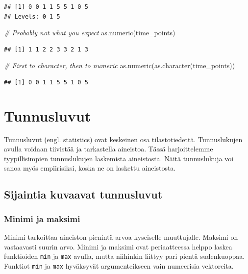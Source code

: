 \documentclass[
]{book}
\newenvironment{Shaded}{\begin{snugshade}}{\end{snugshade}}
\newcommand{\CommentTok}[1]{\textcolor[rgb]{0.56,0.35,0.01}{\textit{#1}}}
\newcommand{\FunctionTok}[1]{\textcolor[rgb]{0.00,0.00,0.00}{#1}}
\newcommand{\NormalTok}[1]{#1}
\begin{document}
\begin{verbatim}
## [1] 0 0 1 1 5 5 1 0 5
## Levels: 0 1 5
\end{verbatim}

\begin{Shaded}
\begin{Highlighting}[]
\CommentTok{\# Probably not what you expect}
\FunctionTok{as.numeric}\NormalTok{(time\_points)}
\end{Highlighting}
\end{Shaded}

\begin{verbatim}
## [1] 1 1 2 2 3 3 2 1 3
\end{verbatim}

\begin{Shaded}
\begin{Highlighting}[]
\CommentTok{\# First to character, then to numeric}
\FunctionTok{as.numeric}\NormalTok{(}\FunctionTok{as.character}\NormalTok{(time\_points))}
\end{Highlighting}
\end{Shaded}

\begin{verbatim}
## [1] 0 0 1 1 5 5 1 0 5
\end{verbatim}

\hypertarget{statistics}{%
\chapter{Tunnusluvut}\label{statistics}}

Tunnusluvut (engl. statistics) ovat keskeinen osa tilastotiedettä. Tunnuslukujen avulla voidaan tiivistää ja tarkastella aineistoa. Tässä harjoittelemme tyypillisimpien tunnuslukujen laskemista aineistosta. Näitä tunnuslukuja voi sanoa myös empiirisiksi, koska ne on laskettu aineistosta.

\hypertarget{sijaintia-kuvaavat-tunnusluvut}{%
\section{Sijaintia kuvaavat tunnusluvut}\label{sijaintia-kuvaavat-tunnusluvut}}

\hypertarget{minimi-ja-maksimi}{%
\subsection{Minimi ja maksimi}\label{minimi-ja-maksimi}}

Minimi tarkoittaa aineiston pienintä arvoa kyseiselle muuttujalle. Maksimi on vastaavasti suurin arvo. Minimi ja maksimi ovat periaatteessa helppo laskea funktioiden \texttt{min} ja \texttt{max} avulla, mutta niihinkin liittyy pari pientä sudenkuoppaa. Funktiot \texttt{min} ja \texttt{max} hyväksyvät argumenteikseen vain numeerisia vektoreita.
\end{document}
